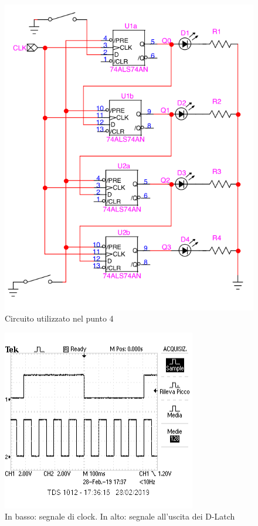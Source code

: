 \documentclass{article}
\begin{document}
	
\begin{figure}
	\centering
	\includegraphics[width=0.7\linewidth]{immagini/circuito4}
	\caption{Circuito utilizzato nel punto 4}
	\label{fig:circuito4}
\end{figure}

\begin{figure}
	\centering
	\includegraphics[width=0.7\linewidth]{immagini/punto_4}
	\caption{In basso: segnale di clock. In alto: segnale all'uscita dei D-Latch}
	\label{fig:punto4}
\end{figure}
\end{document}
